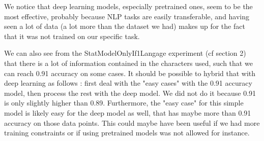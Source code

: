 \documentclass[11pt]{article}
\begin{document}
We notice that deep learning models, especially pretrained ones, seem to be the most effective, probably because NLP tasks are easily transferable, and having seen a lot of data (a lot more than the dataset we had) makes up for the fact that it was not trained on our specific task.

We can also see from the StatModelOnlyIf1Langage experiment (cf section 2) that there is a lot of information contained in the characters used, such that we can reach 0.91 accuracy on some cases. It should be possible to hybrid that with deep learning as follows : first deal with the "easy cases" with the 0.91 accuracy model, then process the rest with the deep model. We did not do it because 0.91  is only slightly higher than 0.89. Furthermore, the "easy case" for this simple model is likely easy for the deep model as well, that has maybe more than 0.91 accuracy on those data points.
This could maybe have been useful if we had more training constraints or if using pretrained models was not allowed for instance.




\end{document}

